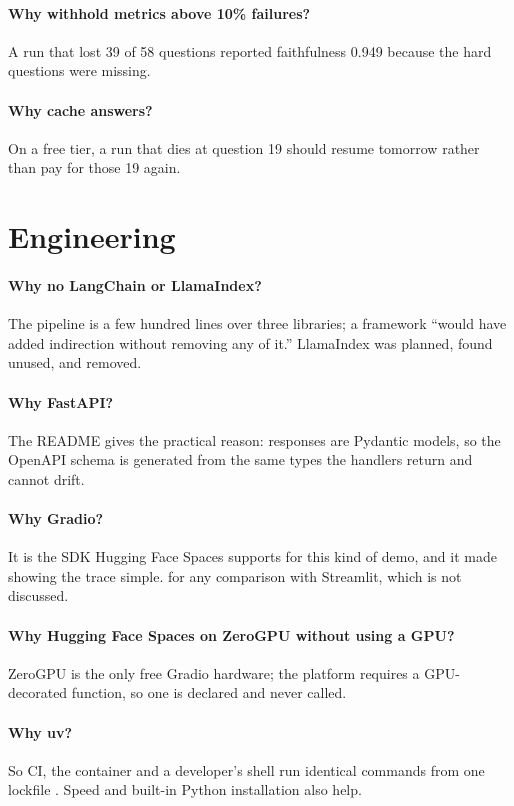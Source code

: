 \paragraph{Why withhold metrics above 10\% failures?} A run that lost 39 of 58 questions reported faithfulness 0.949 because the hard questions were missing.

\paragraph{Why cache answers?} On a free tier, a run that dies at question 19 should resume tomorrow rather than pay for those 19 again.

\section{Engineering}

\paragraph{Why no LangChain or LlamaIndex?} The pipeline is a few hundred lines over three libraries; a framework \enquote{would have added indirection without removing any of it.} LlamaIndex was planned, found unused, and removed.

\paragraph{Why FastAPI?} The README gives the practical reason: responses are Pydantic models, so the OpenAPI schema is generated from the same types the handlers return and cannot drift.

\paragraph{Why Gradio?} It is the SDK Hugging Face Spaces supports for this kind of demo, and it made showing the trace simple. \tagI for any comparison with Streamlit, which is not discussed.

\paragraph{Why Hugging Face Spaces on ZeroGPU without using a GPU?} ZeroGPU is the only free Gradio hardware; the platform requires a GPU-decorated function, so one is declared and never called.

\paragraph{Why uv?} So CI, the container and a developer's shell run identical commands from one lockfile . \tagI Speed and built-in Python installation also help.

